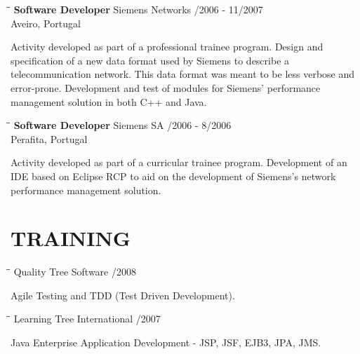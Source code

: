 \documentclass{res}
\begin{document}
\begin{resume}
\begin{tabbing}
\hspace{2.3in}\= \hspace{2.6in}\= \kill %
{\bf Software Developer} \>Siemens Networks    
/2006 - 11/2007\\ \>Aveiro, Portugal
\end{tabbing}\vspace{-20pt}      %
Activity developed as part of a professional trainee program.
Design and specification of a new data format used by Siemens to describe a telecommunication network.
This data format was meant to be less verbose and error-prone.
Development and test of modules for Siemens' performance management solution in both C++ and Java.

\begin{tabbing}
\hspace{2.3in}\= \hspace{2.6in}\= \kill %
{\bf Software Developer} \>Siemens SA    
/2006 - 8/2006\\ \>Perafita, Portugal
\end{tabbing}\vspace{-20pt}      %
Activity developed as part of a curricular trainee program.
Development of an IDE based on Eclipse RCP to aid on the development of Siemens’s network performance management solution.

\section{TRAINING}

\begin{tabbing}
\hspace{2.3in}\= \hspace{2.6in}\= \kill %
{\bf } \>Quality Tree Software    
/2008\\ \>
\end{tabbing}\vspace{-20pt}
Agile Testing and TDD (Test Driven Development).

\begin{tabbing}
\hspace{2.3in}\= \hspace{2.6in}\= \kill %
{\bf } \>Learning Tree International    
/2007\\ \>
\end{tabbing}\vspace{-20pt}
Java Enterprise Application Development - JSP, JSF, EJB3, JPA, JMS.


\end{resume}
\end{document}
